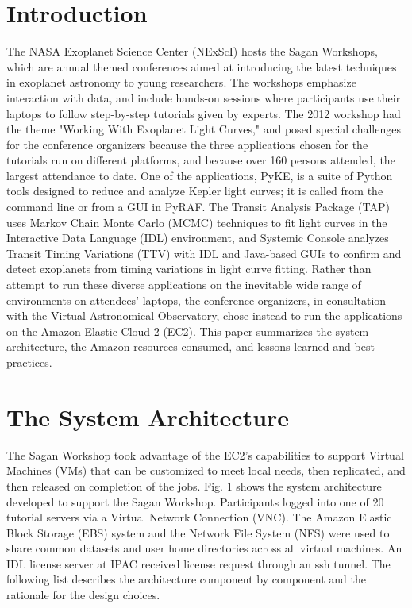 \section{Introduction}
The NASA Exoplanet Science Center (NExScI) hosts the Sagan Workshops, which are annual themed conferences aimed at introducing the latest techniques in exoplanet astronomy to young researchers. The workshops emphasize interaction with data, and include hands-on sessions where participants use their laptops to follow step-by-step tutorials given by experts.  The 2012 workshop had the theme "Working With Exoplanet Light Curves," and posed special challenges for the conference organizers because the  three applications chosen for the tutorials run on different platforms, and because over 160 persons attended,  the largest attendance to date. One of the applications, PyKE, is a suite of Python tools designed to reduce and analyze Kepler light curves; it is called from the command line or from a GUI in PyRAF. The Transit Analysis Package (TAP) uses Markov Chain Monte Carlo (MCMC) techniques to fit light curves in the Interactive Data Language (IDL) environment, and Systemic Console analyzes Transit Timing Variations (TTV) with IDL and Java-based GUIs to confirm and detect exoplanets from timing variations in light curve fitting.  Rather than attempt to run these diverse applications on the inevitable wide range of environments on attendees' laptops, the conference organizers, in consultation with the Virtual Astronomical Observatory, chose instead to run the applications on the Amazon Elastic Cloud 2 (EC2). This paper summarizes the system architecture, the Amazon resources consumed, and lessons learned and best practices.

\section{The System Architecture}

The Sagan Workshop took advantage of the EC2's capabilities to support Virtual Machines (VMs) that can be customized to meet local needs, then replicated, and then released on completion of the jobs. Fig. 1 shows the system architecture developed to support the Sagan Workshop. Participants logged into one of 20 tutorial servers via a Virtual Network Connection (VNC). The Amazon Elastic Block Storage (EBS) system and the Network File System (NFS) were used to share common datasets and user home directories across all virtual machines. An IDL license server at IPAC received license request through an ssh tunnel. The following list describes the architecture component by component and the rationale for the design choices.


